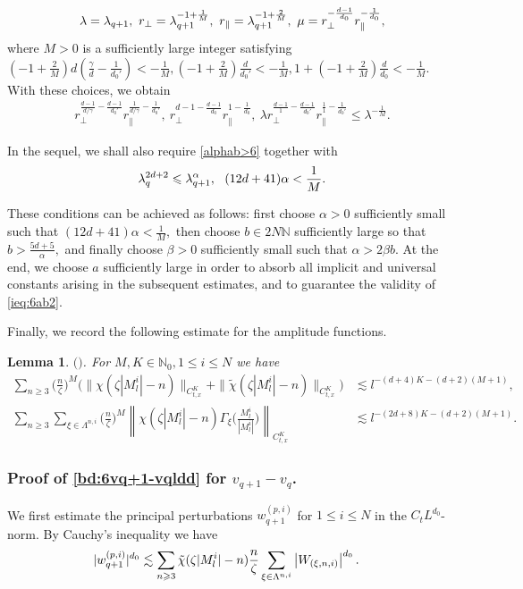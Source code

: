 \documentclass[10pt,a4paper]{amsart}
\numberwithin{equation}{section}
\newtheorem{lemma}[theorem]{Lemma}
\def\({{\Big(}}
\def\){{\Big)}}
\newcommand{\norm}[1]{\left\|#1\right\|}
\def\geq{\geqslant}
\def\leq{\leqslant}
\def\({{\Big(}}
\def\){{\Big)}}
\def\bl{\begin{lemma}}
\def\el{\end{lemma}}
\def\geq{\geqslant}
\def\leq{\leqslant}
\begin{document}
\begin{align}
  \lambda=\lambda_{q+1},\ r_\perp=\lambda_{q+1}^{-1+\frac1{M}},\ r_\parallel=\lambda_{q+1}^{-1+\frac2{M}},\   \mu=r_\perp^{-\frac{d-1}{d_0}}r_\parallel^{-\frac1{d_0}}, \notag
\end{align}
where $M>0$ is a sufficiently large integer satisfying $(-1+\frac2M)d(\frac{\gamma}{d}-\frac{1}{d_0'})<-\frac1M,(-1+\frac2M)\frac{d}{d_0'}<-\frac1M,1+(-1+\frac2M)\frac{d}{d_0}<-\frac1M$.  
With these choices,  we obtain
\begin{align}
  r_\perp^{\frac{d-1}{d/\gamma}-\frac{d-1}{d_0'}} r_\parallel^{\frac1{d/\gamma}-\frac{1}{d_0'}},\    r_\perp^{ d-1 -\frac{d-1}{d_0}} r_\parallel^{1-\frac{1}{d_0}},\ \lambda r_\perp^{\frac{d-1}{1}-\frac{d-1}{d_0'}} r_\parallel^{\frac{1}{1}-\frac{1}{d_0'}}\leq\lambda^{-\frac1M}.\label{bd:paralam6}
\end{align}
 
 

In the sequel, we shall also require \eqref{alphab>6} together with \begin{align}
   \lambda_{q}^{2d+2}\leq\lambda_{q+1}^\alpha,\ \ (12d+41)\alpha<\frac1{M}.\notag
 \end{align} 
 
These conditions can be achieved as follows:
first choose $\alpha>0$ sufficiently small such that
$
(12d+41)\alpha<\frac1{M},
$
then choose
$
b\in2N\mathbb{N}
$
sufficiently large so that
$
b>\frac{5d+5}{\alpha},
$
and finally choose $\beta>0$ sufficiently small such that
$
\alpha>2\beta b.
$
At the end, we choose $a$ sufficiently large in order to absorb all implicit and universal constants arising in the subsequent estimates, and to guarantee the validity of \eqref{ieq:6ab2}.


Finally, we record the following estimate for the amplitude functions.

\bl\label{lem:6chi}$($\cite[Proposition 5.2]{LRZ25}$)$.
 For $ M,K\in\mathbb{N}_0,1\leq i\leq N$  we have
\begin{align*}
    \sum_{n\geq3} \(\frac{n}{\zeta}\)^M\(\|\chi(\zeta|M^{i}_l|-n)\|_{C_{t,x}^K}+ \|\tilde{\chi}(\zeta|M^{i}_l|-n)\|_{C_{t,x}^K}\)&\lesssim l^{- (d+4)K-(d+2)(M+1)},\\
     \sum_{n\geq3}\sum_{\xi\in\Lambda^{n,i}}\(\frac{n}{\zeta}\)^M\norm{\chi(\zeta|M^{i}_l|-n)\Gamma_\xi\(\frac{M^{i}_l}{|M^{i}_l|}\)}_{C_{t,x}^K}& \lesssim l^{-(2d+8)K-(d+2)(M+1)}.
\end{align*}
\el 

\subsubsection{Proof of  \eqref{bd:6vq+1-vqldd}  for $v_{q+1}-v_q$.}
We first estimate the principal perturbations $w_{q+1}^{(p,i)}$ for   $1\leq i\leq N $ in the $C_tL^{d_0}$-norm. By Cauchy's inequality    we have
\begin{align}
|w_{q+1}^{(p,i)}|^{d_0} 
&\lesssim \sum_{n\geq3}\tilde{\chi}(\zeta|M^{i}_l|-n)\frac{n}{\zeta}\sum_{\xi\in\Lambda^{n,i}}\left|W_{(\xi,n,i)} \right|^{d_0}.\notag
\end{align} 
\end{document}
